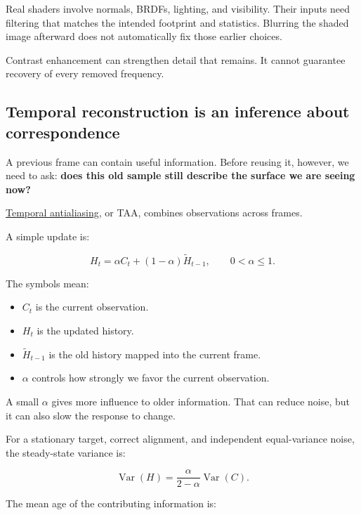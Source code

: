 Real shaders involve normals, BRDFs, lighting, and visibility. Their inputs need filtering that matches the intended footprint and statistics. Blurring the shaded image afterward does not automatically fix those earlier choices.

Contrast enhancement can strengthen detail that remains. It cannot guarantee recovery of every removed frequency.

\subsection{Temporal reconstruction is an inference about correspondence}\label{04-visual-computing-ii-ch043-temporal-reconstruction-is-an-inference-about-correspondence}

\hypertarget{04-visual-computing-ii-ch043-temporal-reconstruction-is-an-inference-about-correspondence}{}

A previous frame can contain useful information. Before reusing it, however, we need to ask: \textbf{does this old sample still describe the surface we are seeing now?}

\hyperref[appendix-0727340a4428]{Temporal antialiasing}, or TAA, combines observations across frames.

A simple update is:

\[
H_t=\alpha C_t+(1-\alpha)\widetilde H_{t-1},
\qquad 0<\alpha\leq1.
\]

The symbols mean:

\begin{itemize}
\tightlist
\item
  \(C_t\) is the current observation.
\item
  \(H_t\) is the updated history.
\item
  \(\widetilde H_{t-1}\) is the old history mapped into the current frame.
\item
  \(\alpha\) controls how strongly we favor the current observation.
\end{itemize}

A small \(\alpha\) gives more influence to older information. That can reduce noise, but it can also slow the response to change.

For a stationary target, correct alignment, and independent equal-variance noise, the steady-state variance is:

\[
\operatorname{Var}(H)
=\frac{\alpha}{2-\alpha}\operatorname{Var}(C).
\]

The mean age of the contributing information is:

